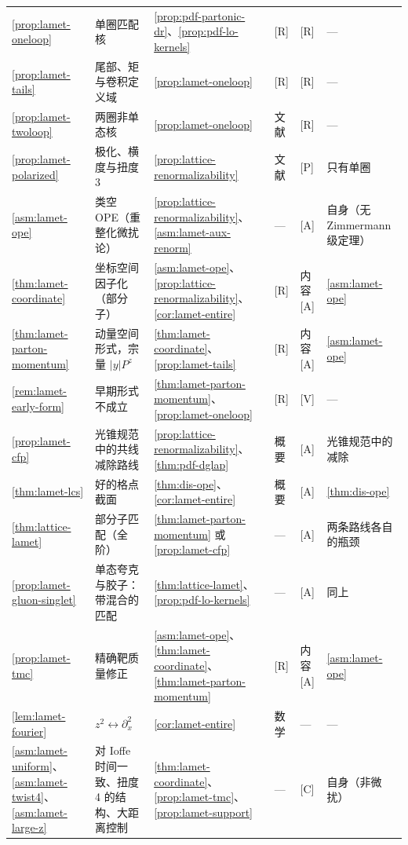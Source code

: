 \begin{table}[htbp]
\begin{tabularx}{\textwidth}{@{}p{1.75cm}Xp{3.85cm}p{0.95cm}p{1.15cm}p{2.45cm}@{}}
\cref{prop:lamet-oneloop} & 单圈匹配核 & \cref{prop:pdf-partonic-dr}、\cref{prop:pdf-lo-kernels} & [R] & [R] & — \\
\cref{prop:lamet-tails} & 尾部、矩与卷积定义域 & \cref{prop:lamet-oneloop} & [R] & [R] & — \\
\cref{prop:lamet-twoloop} & 两圈非单态核 & \cref{prop:lamet-oneloop} & 文献 & [R] & — \\
\cref{prop:lamet-polarized} & 极化、横度与扭度 3 & \cref{prop:lattice-renormalizability} & 文献 & [P] & 只有单圈 \\
\cref{asm:lamet-ope} & 类空 OPE（重整化微扰论） & \cref{prop:lattice-renormalizability}、\cref{asm:lamet-aux-renorm} & — & [A] & 自身（无 Zimmermann 级定理） \\
\cref{thm:lamet-coordinate} & 坐标空间因子化（部分子） & \cref{asm:lamet-ope}、\cref{prop:lattice-renormalizability}、\cref{cor:lamet-entire} & [R] & 内容 [A] & \cref{asm:lamet-ope} \\
\cref{thm:lamet-parton-momentum} & 动量空间形式，宗量 $|y|P^z$ & \cref{thm:lamet-coordinate}、\cref{prop:lamet-tails} & [R] & 内容 [A] & \cref{asm:lamet-ope} \\
\cref{rem:lamet-early-form} & 早期形式不成立 & \cref{thm:lamet-parton-momentum}、\cref{prop:lamet-oneloop} & [R] & [V] & — \\
\cref{prop:lamet-cfp} & 光锥规范中的共线减除路线 & \cref{prop:lattice-renormalizability}、\cref{thm:pdf-dglap} & 概要 & [A] & 光锥规范中的减除 \\
\cref{thm:lamet-lcs} & 好的格点截面 & \cref{thm:dis-ope}、\cref{cor:lamet-entire} & 概要 & [A] & \cref{thm:dis-ope} \\
\cref{thm:lattice-lamet} & 部分子匹配（全阶） & \cref{thm:lamet-parton-momentum} 或\cref{prop:lamet-cfp} & — & [A] & 两条路线各自的瓶颈 \\
\cref{prop:lamet-gluon-singlet} & 单态夸克与胶子：带混合的匹配 & \cref{thm:lattice-lamet}、\cref{prop:pdf-lo-kernels} & — & [A] & 同上 \\
\cref{prop:lamet-tmc} & 精确靶质量修正 & \cref{asm:lamet-ope}、\cref{thm:lamet-coordinate}、\cref{thm:lamet-parton-momentum} & [R] & 内容 [A] & \cref{asm:lamet-ope} \\
\cref{lem:lamet-fourier} & $z^2\leftrightarrow\partial_x^2$ & \cref{cor:lamet-entire} & 数学 & — & — \\
\cref{asm:lamet-uniform}、\cref{asm:lamet-twist4}、\cref{asm:lamet-large-z} & 对 Ioffe 时间一致、扭度 4 的结构、大距离控制 & \cref{thm:lamet-coordinate}、\cref{prop:lamet-tmc}、\cref{prop:lamet-support} & — & [C] & 自身（非微扰） \\

\end{tabularx}
\end{table}
